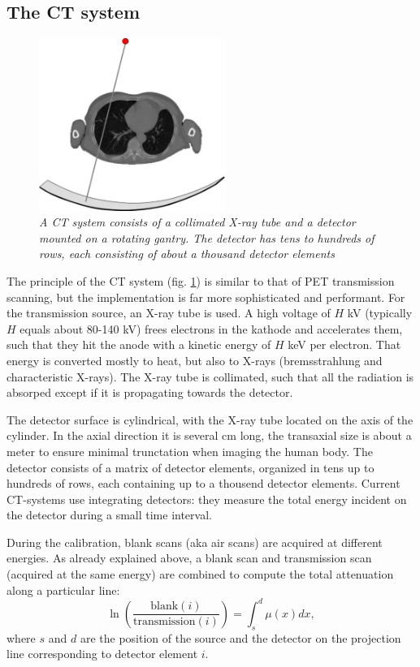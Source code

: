 \documentclass[11pt,oneside]{book}
\begin{document}
\subsection{The CT system}
\begin{figure}[tbp]
\centering \includegraphics[width=0.54\textwidth]{figs/fig_ct.pdf} 
\caption{\label{fig:ct} \emph{A CT system consists of a collimated
    X-ray tube and a detector mounted on a rotating gantry. The
    detector has tens to hundreds of rows, each consisting of about a
    thousand detector elements}}
\end{figure}
%
The principle of the CT system (fig. \ref{fig:ct}) is similar to that
of PET transmission scanning, but the implementation is far more
sophisticated and performant. For the transmission source, an X-ray
tube is used. A high voltage of $H$ kV (typically $H$ equals about
80-140 kV) frees electrons in the kathode and accelerates them, such
that they hit the anode with a kinetic energy of $H$ keV per electron.
That energy is converted mostly to heat, but also to X-rays
(bremsstrahlung and characteristic X-rays). The X-ray tube is
collimated, such that all the radiation is absorped except if it is
propagating towards the detector.

The detector surface is cylindrical, with the X-ray tube located on
the axis of the cylinder. In the axial direction it is several cm
long, the transaxial size is about a meter to ensure minimal
trunctation when imaging the human body. The detector consists of a
matrix of detector elements, organized in tens up to hundreds of rows,
each containing up to a thousend detector elements. Current CT-systems
use integrating detectors: they measure the total energy incident on
the detector during a small time interval.

During the calibration, blank scans (aka air scans) are acquired at
different energies. As already explained above, a blank scan and
transmission scan (acquired at the same energy) are combined to
compute the total attenuation along a particular line:
\begin{equation}
  \ln\left(\frac{\mbox{blank}(i)}{\mbox{transmission}(i)}\right) 
     = \int_s^d \mu(x) dx, \label{eq:totatten}
\end{equation}
where $s$ and $d$ are the position of the source and the detector on
the projection line corresponding to detector element $i$.
\end{document}

